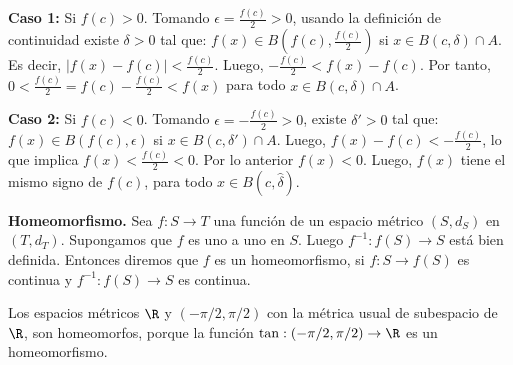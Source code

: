 \begin{dem}
\textbf{Caso 1:} Si $f(c)>0$. Tomando $\epsilon=\frac{f(c)}{2}>0$, usando la definición de continuidad existe $\delta>0$ tal que: %
$f(x)\in B\left(f(c), \frac{f(c)}{2}\right)$ si $x\in B(c,\delta)\cap A$. %
Es decir, $|f(x)-f(c)| < \frac{f(c)}{2}$. %
Luego, $-\frac{f(c)}{2} < f(x)-f(c)$. %
Por tanto, $0 < \frac{f(c)}{2} = f(c)-\frac{f(c)}{2} < f(x)$ para todo $x\in B(c,\delta)\cap A$. %

\textbf{Caso 2:} Si $f(c)<0$. Tomando $\epsilon=-\frac{f(c)}{2}>0$, existe $\delta'>0$ tal que: %
$f(x)\in B(f(c),\epsilon)$ si $x\in B(c,\delta')\cap A$. %
Luego, $f(x)-f(c) < -\frac{f(c)}{2}$, lo que implica $f(x) < \frac{f(c)}{2} < 0$. %
Por lo anterior $f(x) < 0$. %
Luego, $f(x)$ tiene el mismo signo de $f(c)$, para todo $x\in B(c,\hat{\delta})$. %
\end{dem}

\begin{definicion}
\textbf{Homeomorfismo.} Sea $f:S\rightarrow T$ una función de un espacio métrico $(S, d_S)$ en $(T, d_T)$. %
Supongamos que $f$ es uno a uno en $S$. Luego $f^{-1}:f(S)\longrightarrow S$ está bien definida. %
Entonces diremos que $f$ es un homeomorfismo, si $f:S\rightarrow f(S)$ es continua y $f^{-1}:f(S)\rightarrow S$ es continua. %
\end{definicion}

\begin{example}
Los espacios métricos $\R$ y $(-\pi/2, \pi/2)$ con la métrica usual de subespacio de $\R$, son homeomorfos, porque la función $\tan: (-\pi/2, \pi/2)\rightarrow \R$ es un homeomorfismo. %
\end{example}